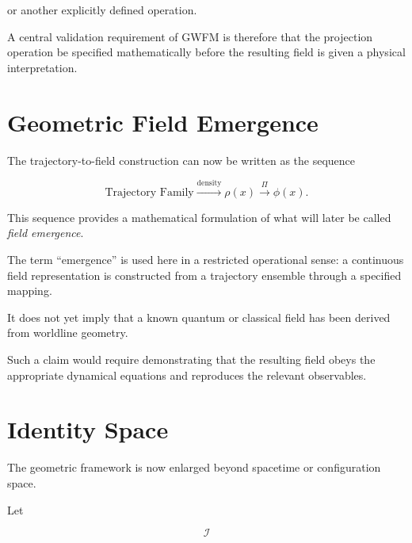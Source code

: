 \documentclass[12pt,oneside]{book}
\begin{document}
or another explicitly defined operation.

A central validation requirement of GWFM is therefore that the
projection operation be specified mathematically before the
resulting field is given a physical interpretation.


\section{Geometric Field Emergence}
\label{sec:geometric-field-emergence}

The trajectory-to-field construction can now be written as the
sequence

\begin{equation}
    \boxed{
    \text{Trajectory Family}
    \xrightarrow{\text{density}}
    \rho(x)
    \xrightarrow{\Pi}
    \phi(x)
    }.
    \label{eq:field-emergence-sequence}
\end{equation}

This sequence provides a mathematical formulation of what will
later be called \emph{field emergence}.

The term ``emergence'' is used here in a restricted operational
sense: a continuous field representation is constructed from a
trajectory ensemble through a specified mapping.

It does not yet imply that a known quantum or classical field
has been derived from worldline geometry.

Such a claim would require demonstrating that the resulting
field obeys the appropriate dynamical equations and reproduces
the relevant observables.


\section{Identity Space}
\label{sec:identity-space-geometry}

The geometric framework is now enlarged beyond spacetime or
configuration space.

Let

\begin{equation}
    \mathcal{I}
\end{equation}
\end{document}
